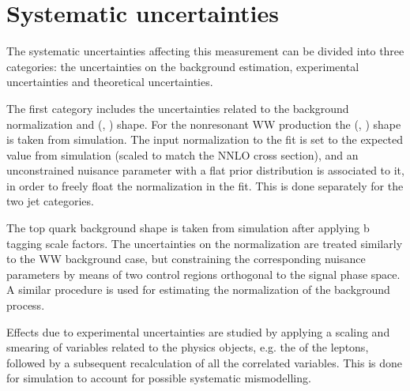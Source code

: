 \section{Systematic uncertainties}\label{chap5:systs}

The systematic uncertainties affecting this measurement can be divided into three categories: the uncertainties on the background estimation, experimental uncertainties and theoretical uncertainties.

The first category includes the uncertainties related to the background normalization and (\mll, \mt) shape. For the nonresonant WW production the (\mll, \mt) shape is taken from simulation. The input normalization to the fit is set to the expected value from simulation (scaled to match the NNLO cross section), and an unconstrained nuisance parameter with a flat prior distribution is associated to it, in order to freely float the normalization in the fit. This is done separately for the two jet categories.

The top quark background shape is taken from simulation after applying b tagging scale factors. The uncertainties on the normalization are treated similarly to the WW background case, but constraining the corresponding nuisance parameters by means of two control regions orthogonal to the signal phase space. A similar procedure is used for estimating the normalization of the \dytt background process.

Effects due to experimental uncertainties are studied by applying a scaling and smearing of variables related to the physics objects, e.g. the \pt of the leptons, followed by a subsequent recalculation of all the correlated variables. This is done for simulation to account for possible systematic mismodelling.

